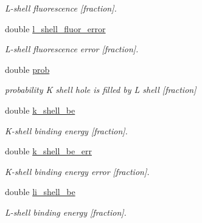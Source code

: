 \begin{DoxyCompactItemize}
\begin{DoxyCompactList}\small\item\em L-\/shell fluorescence \mbox{[}fraction\mbox{]}. \end{DoxyCompactList}\item 
\mbox{\label{structpyne_1_1atomic_a57bf6fca3f31ca0cbe32fb3be25d7967}} 
double \hyperlink{structpyne_1_1atomic_a57bf6fca3f31ca0cbe32fb3be25d7967}{l\+\_\+shell\+\_\+fluor\+\_\+error}
\begin{DoxyCompactList}\small\item\em L-\/shell fluorescence error \mbox{[}fraction\mbox{]}. \end{DoxyCompactList}\item 
\mbox{\label{structpyne_1_1atomic_a018b03f4b2b8fcab0ed7b535f1816d54}} 
double \hyperlink{structpyne_1_1atomic_a018b03f4b2b8fcab0ed7b535f1816d54}{prob}
\begin{DoxyCompactList}\small\item\em probability K shell hole is filled by L shell \mbox{[}fraction\mbox{]} \end{DoxyCompactList}\item 
\mbox{\label{structpyne_1_1atomic_a9ec608c1cb13601a20448543a3955630}} 
double \hyperlink{structpyne_1_1atomic_a9ec608c1cb13601a20448543a3955630}{k\+\_\+shell\+\_\+be}
\begin{DoxyCompactList}\small\item\em K-\/shell binding energy \mbox{[}fraction\mbox{]}. \end{DoxyCompactList}\item 
\mbox{\label{structpyne_1_1atomic_a831e7a1924e250f3773e4ca68ebc9578}} 
double \hyperlink{structpyne_1_1atomic_a831e7a1924e250f3773e4ca68ebc9578}{k\+\_\+shell\+\_\+be\+\_\+err}
\begin{DoxyCompactList}\small\item\em K-\/shell binding energy error \mbox{[}fraction\mbox{]}. \end{DoxyCompactList}\item 
\mbox{\label{structpyne_1_1atomic_a539b9ff378974c1c2fde1c0bb56d0634}} 
double \hyperlink{structpyne_1_1atomic_a539b9ff378974c1c2fde1c0bb56d0634}{li\+\_\+shell\+\_\+be}
\begin{DoxyCompactList}\small\item\em L-\/shell binding energy \mbox{[}fraction\mbox{]}. \end{DoxyCompactList}\item 

\end{DoxyCompactItemize}
